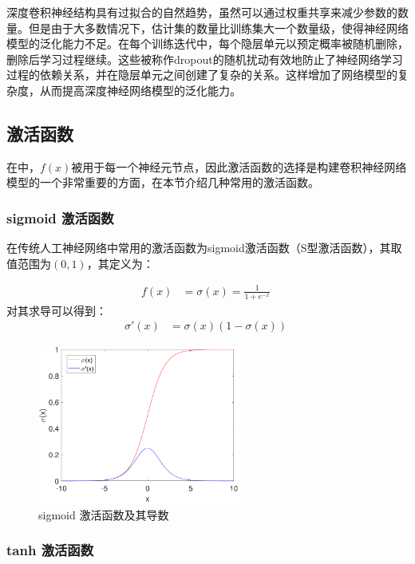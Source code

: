 深度卷积神经结构具有过拟合的自然趋势，虽然可以通过权重共享来减少参数的数量。但是由于大多数情况下，估计集的数量比训练集大一个数量级，使得神经网络模型的泛化能力不足。在每个训练迭代中，每个隐层单元以预定概率被随机删除，删除后学习过程继续。这些被称作dropout的随机扰动有效地防止了神经网络学习过程的依赖关系，并在隐层单元之间创建了复杂的关系。这样增加了网络模型的复杂度，从而提高深度神经网络模型的泛化能力。


\subsection{激活函数}

在中，$f(x)$被用于每一个神经元节点，因此激活函数的选择是构建卷积神经网络模型的一个非常重要的方面，在本节介绍几种常用的激活函数。

\subsubsection{sigmoid 激活函数}

在传统人工神经网络中常用的激活函数为sigmoid激活函数（S型激活函数），其取值范围为$(0,1)$，其定义为：

\begin{align}
f(x)&=\sigma(x)=\frac{1}{1+e^{-x}}\;
\end{align}
对其求导可以得到：
\begin{align}
\sigma'(x)&=\sigma(x)\left(1-\sigma(x)\right)\;
\end{align}

\begin{figure}[hbt]
	\centering
	\includegraphics[width=6.67cm]{figures/networks/sigmoid}
	\caption{sigmoid 激活函数及其导数}
	\label{fig:sigmoid}
\end{figure}

\subsubsection{ tanh 激活函数}

